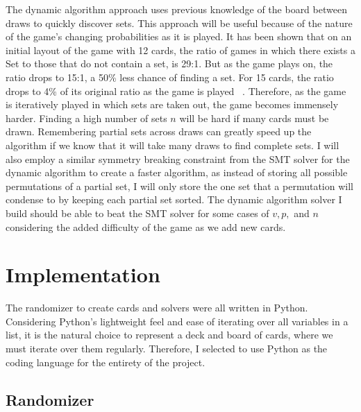 \documentclass[pageno]{jpaper}
\begin{document}
The dynamic algorithm approach uses previous knowledge of the board between draws to quickly discover sets. This approach will be useful because of the nature of the game's changing probabilities as it is played. It has been shown that on an initial layout of the game with 12 cards, the ratio of games in which there exists a Set to those that do not contain a set, is 29:1. But as the game plays on, the ratio drops to 15:1, a 50\% less chance of finding a set. For 15 cards, the ratio drops to 4\% of its original ratio as the game is played ~\cite{norvig}. Therefore, as the game is iteratively played in which sets are taken out, the game becomes immensely harder. Finding a high number of sets $n$ will be hard if many cards must be drawn. Remembering partial sets across draws can greatly speed up the algorithm if we know that it will take many draws to find complete sets. I will also employ a similar symmetry breaking constraint from the SMT solver for the dynamic algorithm to create a faster algorithm, as instead of storing all possible permutations of a partial set, I will only store the one set that a permutation will condense to by keeping each partial set sorted. The dynamic algorithm solver I build should be able to beat the SMT solver for some cases of $v,p,$ and $n$ considering the added difficulty of the game as we add new cards.

\section{Implementation}

The randomizer to create cards and solvers were all written in Python. Considering Python's lightweight feel and ease of iterating over all variables in a list, it is the natural choice to represent a deck and board of cards, where we must iterate over them regularly. Therefore, I selected to use Python as the coding language for the entirety of the project. 


\subsection{Randomizer}
\end{document}
